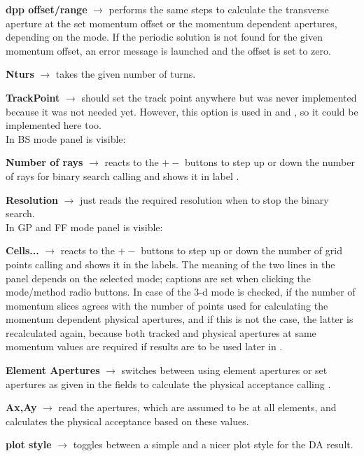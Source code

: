 \documentclass[12pt]{article}
\newcommand\code[1]{{\tt #1}}
\newcommand{\ofld}[1]{\colorbox{black!15}{{\bf #1}}}
\newcommand\guico[1]{{\color{blue}\code{#1}}}
\newcommand{\evcod}[2]{\ofld{#1} $\rightarrow$ \guico{#2}}
\newcommand{\opagui}[1]{\colorbox{blue!20}{{\color{black}\code{#1}}}}
\newcommand{\ogui}[1]{\hyperref[#1]{\opagui{#1}}}
\newcommand{\todo}[1]{{\color{red} #1}}
\begin{document}
\evcod{dpp offset/range}{eddppaction} performs the same steps to calculate the transverse aperture at the set momentum offset or the momentum dependent apertures, depending on the mode. If the periodic solution is not found for the given momentum offset, an error message is launched and the offset is set to zero.

\evcod{Nturs}{edturns(KeyPress,Exit)} takes the given number of turns.

\todo{\evcod{TrackPoint}{esposaction} should set the track point anywhere but was never implemented because it was not needed yet. However, this option is used in \ogui{opatrackps} and \ogui{opatracktt}, so it could be implemented here too.}\\[1ex]

In BS mode panel \guico{PanNRay} is visible: 

\evcod{Number of rays}{butnrclick} reacts to the \ofld{$+-$} buttons to step up or down the number of rays for binary search calling \guico{UpdateGridParams} and shows it in label \guico{labnr}.

\evcod{Resolution}{edreso(KEyPress,Exit)} just reads the required resolution when to stop the binary search. \\[1ex]

In GP and FF mode panel \guico{PanGrid} is visible:

\evcod{Cells...}{bugNgClick} reacts to the \ofld{$+-$} buttons to step up or down the number of grid points calling \guico{UpdateGridParams} and shows it in the labels. The meaning of the two lines in the panel depends on the selected mode; captions are set when clicking the mode/method radio buttons. In case of the 3-d mode is checked, if the number of momentum slices agrees with the number of points used for calculating the momentum dependent physical apertures, and if this is not the case, the latter is recalculated again, because both tracked and physical apertures at same momentum values are required if results are to be used later in \ogui{opatracktt}.

\evcod{Element Apertures}{cbxAperClick} switches between using element apertures or set apertures as given in the \guico{eda(x,y)} fields to calculate the physical acceptance calling \guico{UpdateApertures}.

\evcod{Ax,Ay}{eda(x,y)(KeyPress,Exit)} read the apertures, which are assumed to be at all elements, and calculates the physical acceptance based on these values.

\evcod{plot style}{butplotStyleClick} toggles between a simple and a nicer plot style for the DA result.
\end{document}

